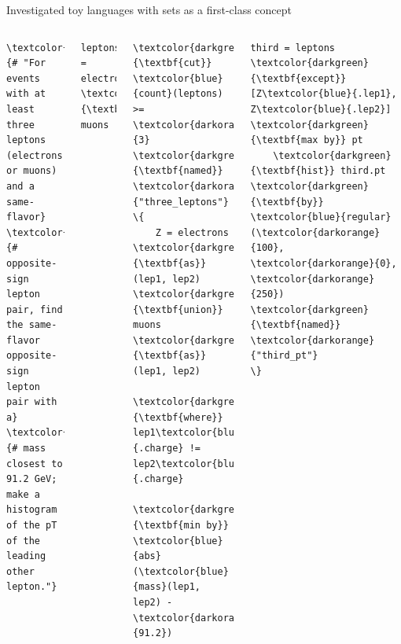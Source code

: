 \documentclass[aspectratio=169]{beamer}
\begin{document}
\begin{frame}[fragile]{Investigated toy languages with sets as a first-class concept}
\begin{center}
\end{center}

\vspace{-0.25 cm}
\begin{columns}
\scriptsize
\begin{Verbatim}[commandchars=\\\{\}]
\textcolor{gray}{# "For events with at least three leptons (electrons or muons) and a same-flavor}
\textcolor{gray}{# opposite-sign lepton pair, find the same-flavor opposite-sign lepton pair with a}
\textcolor{gray}{# mass closest to 91.2 GeV; make a histogram of the pT of the leading other lepton."}
\end{Verbatim}

\small
\vspace{-0.25 cm}
\begin{Verbatim}[commandchars=\\\{\}]
leptons = electrons \textcolor{darkgreen}{\textbf{union}} muons
\end{Verbatim}

\vspace{-0.45 cm}
\begin{Verbatim}[commandchars=\\\{\}]
\textcolor{darkgreen}{\textbf{cut}} \textcolor{blue}{count}(leptons) >= \textcolor{darkorange}{3} \textcolor{darkgreen}{\textbf{named}} \textcolor{darkorange}{"three_leptons"} \{
    Z = electrons \textcolor{darkgreen}{\textbf{as}} (lep1, lep2) \textcolor{darkgreen}{\textbf{union}} muons \textcolor{darkgreen}{\textbf{as}} (lep1, lep2)
            \textcolor{darkgreen}{\textbf{where}} lep1\textcolor{blue}{.charge} != lep2\textcolor{blue}{.charge}
            \textcolor{darkgreen}{\textbf{min by}} \textcolor{blue}{abs}(\textcolor{blue}{mass}(lep1, lep2) - \textcolor{darkorange}{91.2})
\end{Verbatim}

\vspace{-0.45 cm}
\begin{Verbatim}[commandchars=\\\{\}]
    third = leptons \textcolor{darkgreen}{\textbf{except}} [Z\textcolor{blue}{.lep1}, Z\textcolor{blue}{.lep2}] \textcolor{darkgreen}{\textbf{max by}} pt
    \textcolor{darkgreen}{\textbf{hist}} third.pt \textcolor{darkgreen}{\textbf{by}} \textcolor{blue}{regular}(\textcolor{darkorange}{100}, \textcolor{darkorange}{0}, \textcolor{darkorange}{250}) \textcolor{darkgreen}{\textbf{named}} \textcolor{darkorange}{"third_pt"}
\}
\end{Verbatim}


\end{columns}
\end{frame}
\end{document}

